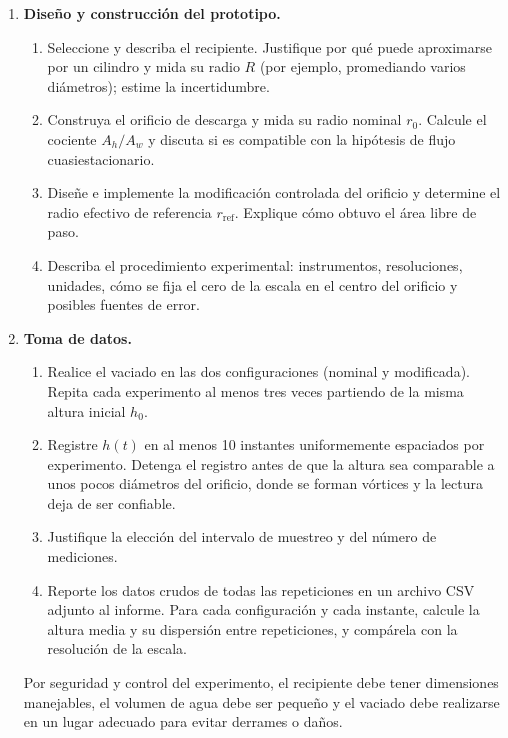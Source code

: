 \documentclass[oneside,letter,spanish,activeacute,english,links,10pt]{amcaGCS_EDO}
\begin{document}
	\begin{enumerate}
		\item {\bf Diseño y construcción del prototipo.}
		\begin{enumerate}
			\item Seleccione y describa el recipiente. Justifique por qué puede aproximarse por un cilindro y mida su radio $R$ (por ejemplo, promediando varios diámetros); estime la incertidumbre.
			\item Construya el orificio de descarga y mida su radio nominal $r_0$. Calcule el cociente $A_h/A_w$ y discuta si es compatible con la hipótesis de flujo cuasiestacionario.
			\item Diseñe e implemente la modificación controlada del orificio y determine el radio efectivo de referencia $r_{\mathrm{ref}}$. Explique cómo obtuvo el área libre de paso.
			\item Describa el procedimiento experimental: instrumentos, resoluciones, unidades, cómo se fija el cero de la escala en el centro del orificio y posibles fuentes de error.
		\end{enumerate}
		
		\item {\bf Toma de datos.}
		\begin{enumerate}
			\item Realice el vaciado en las dos configuraciones (nominal y modificada). Repita cada experimento al menos tres veces partiendo de la misma altura inicial $h_0$.
			\item Registre $h(t)$ en al menos 10 instantes uniformemente espaciados por experimento. Detenga el registro antes de que la altura sea comparable a unos pocos diámetros del orificio, donde se forman vórtices y la lectura deja de ser confiable.
			\item Justifique la elección del intervalo de muestreo y del número de mediciones.
			\item Reporte los datos crudos de todas las repeticiones en un archivo CSV adjunto al informe. Para cada configuración y cada instante, calcule la altura media y su dispersión entre repeticiones, y compárela con la resolución de la escala.
		\end{enumerate}
		\noindent Por seguridad y control del experimento, el recipiente debe tener dimensiones manejables, el volumen de agua debe ser pequeño y el vaciado debe realizarse en un lugar adecuado para evitar derrames o daños.
		

\end{enumerate}
\end{document}
